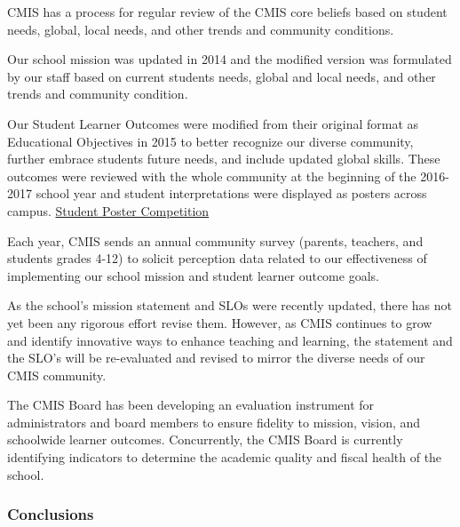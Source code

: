 \begin{findings}
CMIS has a process for regular review of the CMIS core beliefs based on student needs, global, local needs, and other trends and community conditions.

Our school mission was updated in 2014 and the modified version was formulated by our staff based on current students needs, global and local needs, and other trends and community condition. 

Our Student Learner Outcomes were modified from their original format as Educational Objectives in 2015 to better recognize our diverse community, further embrace students future needs, and include updated global skills. These outcomes were reviewed with the whole community at the beginning of the 2016-2017 school year and student interpretations were displayed as posters across campus. \href{https://docs.google.com/a/cmis.ac.th/presentation/d/1bdi1LZUjWbGKOyB0XR9CGyoY2xLY39SZVKhiHTIJGxc/edit?usp=sharing}{Student Poster Competition}

Each year, CMIS sends an annual community survey (parents, teachers, and students grades 4-12) to solicit perception data related to our effectiveness of implementing our school mission and student learner outcome goals.


As the school’s mission statement and SLOs were recently updated, there has not yet been any rigorous effort revise them.  However, as CMIS continues to grow and identify innovative ways to enhance teaching and learning, the statement and the SLO’s will be re-evaluated and revised to mirror the diverse needs of our CMIS community.

The CMIS Board has been developing an evaluation instrument for administrators and board members to ensure fidelity to mission, vision, and schoolwide learner outcomes.  Concurrently, the CMIS Board is currently identifying indicators to determine the academic quality and fiscal health of the school. 
\end{findings}

\subsubsection{Conclusions}


